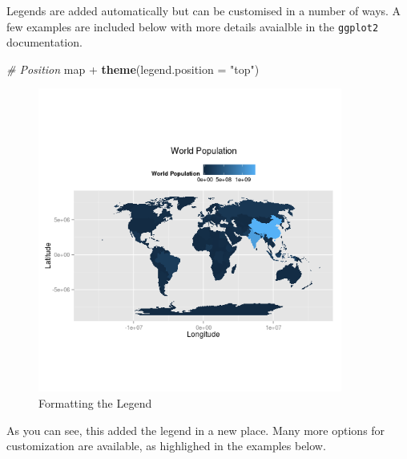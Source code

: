 \documentclass[]{article}
\newenvironment{Shaded}{}{}
\newcommand{\KeywordTok}[1]{\textcolor[rgb]{0.00,0.44,0.13}{\textbf{{#1}}}}
\newcommand{\DataTypeTok}[1]{\textcolor[rgb]{0.56,0.13,0.00}{{#1}}}
\newcommand{\StringTok}[1]{\textcolor[rgb]{0.25,0.44,0.63}{{#1}}}
\newcommand{\CommentTok}[1]{\textcolor[rgb]{0.38,0.63,0.69}{\textit{{#1}}}}
\newcommand{\NormalTok}[1]{{#1}}
\let\Oldincludegraphics\includegraphics
\renewcommand{\includegraphics}[1]{\Oldincludegraphics[width=10cm]{#1}}
\begin{document}
Legends are added automatically but can be customised in a number of
ways. A few examples are included below with more details avaialble in
the \texttt{ggplot2} documentation.

\begin{Shaded}
\begin{Highlighting}[]
\CommentTok{# Position}
\NormalTok{map + }\KeywordTok{theme}\NormalTok{(}\DataTypeTok{legend.position =} \StringTok{"top"}\NormalTok{)}
\end{Highlighting}
\end{Shaded}
\begin{figure}[htbp]
\centering
\includegraphics{figure/Formatting_the_Legend.png}
\caption{Formatting the Legend}
\end{figure}

As you can see, this added the legend in a new place. Many more options
for customization are available, as highlighed in the examples below.
\end{document}
